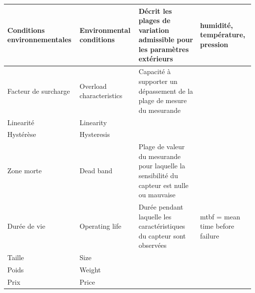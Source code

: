 \documentclass[main.tex]{subfiles}
\begin{document}
\begin {center}
\begin{tabular}{|p{2.2cm}|p{2.8cm}|p{6.8cm}|p{2.4cm}|}
    \hline
    Conditions environnementales & Environmental conditions & Décrit les plages de variation admissible pour les paramètres extérieurs                                                & humidité, température, pression \\
    \hline
    Facteur de surcharge         & Overload characteristics & Capacité à supporter un dépassement de la plage de mesure du mesurande                                                  &                                 \\
    \hline
    Linearité                    & Linearity                &                                                                                                                         &                                 \\
    \hline
    Hystérèse                    & Hysteresis               &                                                                                                                         &                                 \\
    \hline
    Zone morte                   & Dead band                & Plage de valeur du mesurande pour laquelle la sensibilité du capteur est nulle ou mauvaise                              &                                 \\
    \hline
    Durée de vie                 & Operating life           & Durée pendant laquelle les caractéristiques du capteur sont observées                                                   & mtbf = mean time before failure \\
    \hline
    Taille                       & Size                     &                                                                                                                         &                                 \\
    \hline
    Poids                        & Weight                   &                                                                                                                         &                                 \\
    \hline
    Prix                         & Price                    &                                                                                                                         &                                 \\
    \hline
\end{tabular}
\end{center}
\end{document}
